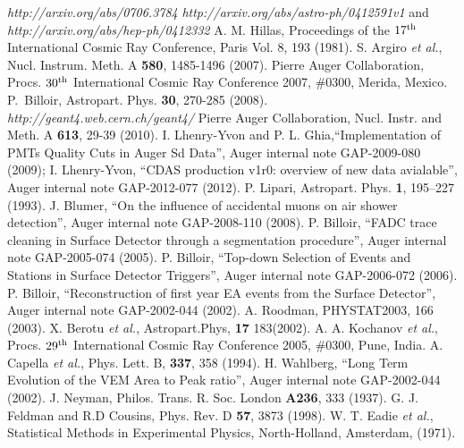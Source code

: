 \begin{thebibliography}{1}
 \emph{http://arxiv.org/abs/0706.3784}
 \emph{http://arxiv.org/abs/astro-ph/0412591v1} and \emph{http://arxiv.org/abs/hep-ph/0412332}
 A. M. Hillas, Proceedings of the $17^{\rm th}$ International Cosmic Ray Conference, Paris Vol. 8, 193 (1981).
 S. Argiro {\it et al.}, Nucl. Instrum. Meth. A \textbf{580}, 1485-1496 (2007).
 Pierre Auger Collaboration, Procs. $30^{\rm th}$ International Cosmic Ray Conference 2007, $\#$0300, Merida, Mexico.
 P.~Billoir, Astropart. Phys. {\bf 30}, 270-285 (2008).
 \emph{http://geant4.web.cern.ch/geant4/}
 Pierre Auger Collaboration, Nucl. Instr. and Meth. A {\bf 613}, 29-39 (2010).
 I. Lhenry-Yvon and P. L. Ghia,``Implementation of PMTs Quality Cuts in Auger Sd Data'', Auger internal note GAP-2009-080 (2009);
I. Lhenry-Yvon, ``CDAS production v1r0: overview of new data avialable'', Auger internal note GAP-2012-077 (2012).
 P. Lipari, Astropart. Phys. \textbf{1}, 195–227 (1993).
 J. Blumer, ``On the influence of accidental muons on air shower detection'', Auger internal note GAP-2008-110 (2008).
  P. Billoir, ``FADC trace cleaning in Surface Detector through a segmentation procedure'', Auger internal note GAP-2005-074 (2005).
  P. Billoir, ``Top-down Selection of Events and Stations in Surface Detector Triggers'', Auger internal note GAP-2006-072 (2006).
 P. Billoir, ``Reconstruction of first year EA events from the Surface Detector'', Auger internal note GAP-2002-044 (2002).
 A. Roodman, PHYSTAT2003, 166 (2003).
 X. Berotu {\it et al.}, Astropart.Phys, \textbf{17}  183(2002).
 A. A. Kochanov {\it et al.}, Procs. $29^{\rm th}$ International Cosmic Ray Conference 2005, $\#$0300, Pune, India.
A. Capella {\it et al.}, Phys. Lett. B, \textbf{337}, 358 (1994).
 H. Wahlberg, ``Long Term Evolution of the VEM Area to Peak ratio'', 
Auger internal note GAP-2002-044 (2002).
 J. Neyman, Philos. Trans. R. Soc. London \textbf{A236}, 333 (1937).
 G. J. Feldman and R.D Cousins, Phys. Rev. D \textbf{57}, 3873 (1998).
 W. T. Eadie {\it et al.}, Statistical Methods in Experimental Physics, North-Holland, Amsterdam, (1971).

\end{thebibliography}
